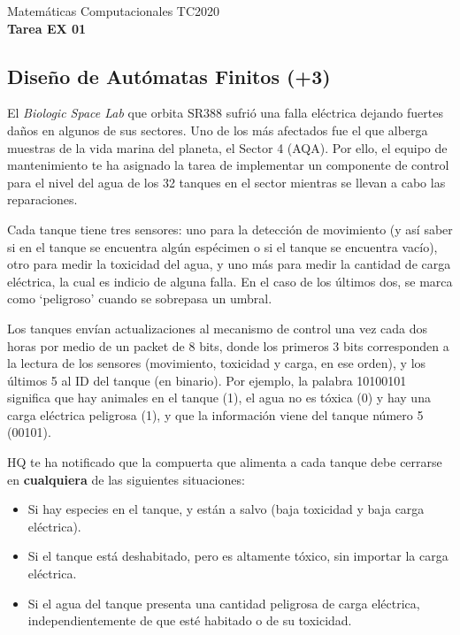 \documentclass[]{book}
\theoremstyle{definition}
\begin{document}
\begin{center}
{\huge Matemáticas Computacionales TC2020}\\[1.5ex]
{\large \textbf{Tarea EX 01}\\[1.5ex]} %
\end{center}

\vspace{0.2 cm}

\subsection*{Diseño de Autómatas Finitos (+3)}

El \textit{Biologic Space Lab} que orbita \textsc{SR388} sufrió una falla eléctrica dejando fuertes daños en algunos de sus sectores.
Uno de los más afectados fue el que alberga muestras de la vida marina del planeta, el Sector 4 (AQA).
Por ello, el equipo de mantenimiento te ha asignado la tarea de implementar un componente de control para el nivel del agua de los 32 tanques en el sector mientras se llevan a cabo las reparaciones.

Cada tanque tiene tres sensores: uno para la detección de movimiento (y así saber si en el tanque se encuentra algún espécimen o si el tanque se encuentra vacío), otro para medir la toxicidad del agua, y uno más para medir la cantidad de carga eléctrica, la cual es indicio de alguna falla.
En el caso de los últimos dos, se marca como `peligroso' cuando se sobrepasa un umbral.

Los tanques envían actualizaciones al mecanismo de control una vez cada dos horas por medio de un packet de 8 bits, donde los primeros 3 bits corresponden a la lectura de los sensores (movimiento, toxicidad y carga, en ese orden), y los últimos 5 al ID del tanque (en binario). Por ejemplo, la palabra 10100101 significa que hay animales en el tanque (1), el agua no es tóxica (0) y hay una carga eléctrica peligrosa (1), y que la información viene del tanque número 5 (00101).

HQ te ha notificado que la compuerta que alimenta a cada tanque debe cerrarse en \textbf{cualquiera} de las siguientes situaciones:

\begin{itemize}
    \itemsep0em
    \item Si hay especies en el tanque, y están a salvo (baja toxicidad y baja carga eléctrica).
    \item Si el tanque está deshabitado, pero es altamente tóxico, sin importar la carga eléctrica.
    \item Si el agua del tanque presenta una cantidad peligrosa de carga eléctrica, independientemente de que esté habitado o de su toxicidad.
\end{itemize}
\end{document}
